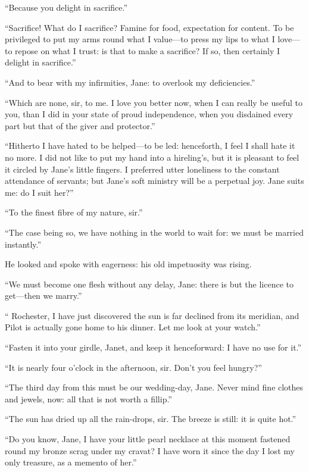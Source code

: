 \enquote{Because you delight in sacrifice.}

\enquote{Sacrifice! What do I sacrifice? Famine for food, expectation
for content. To be privileged to put my arms round what I value---to
press my lips to what I love---to repose on what I trust: is that to
make a sacrifice? If so, then certainly I delight in sacrifice.}

\enquote{And to bear with my infirmities, Jane: to overlook my
deficiencies.}

\enquote{Which are none, sir, to me. I love you better now, when I can
really be useful to you, than I did in your state of proud independence,
when you disdained every part but that of the giver and protector.}

\enquote{Hitherto I have hated to be helped---to be led: henceforth, I
feel I shall hate it no more. I did not like to put my hand into a
hireling's, but it is pleasant to feel it circled by Jane's little
fingers. I preferred utter loneliness to the constant attendance of
servants; but Jane's soft ministry will be a perpetual joy. Jane suits
me: do I suit her?}

\enquote{To the finest fibre of my nature, sir.}

\enquote{The case being so, we have nothing in the world to wait for: we
must be married instantly.}

He looked and spoke with eagerness: his old impetuosity was rising.

\enquote{We must become one flesh without any delay, Jane: there is but
the licence to get---then we marry.}

\enquote{\Mr{} Rochester, I have just discovered the sun is far declined
from its meridian, and Pilot is actually gone home to his dinner. Let
me look at your watch.}

\enquote{Fasten it into your girdle, Janet, and keep it henceforward: I
have no use for it.}

\enquote{It is nearly four o'clock in the afternoon, sir. Don't you
feel hungry?}

\enquote{The third day from this must be our wedding-day, Jane. Never
mind fine clothes and jewels, now: all that is not worth a fillip.}

\enquote{The sun has dried up all the rain-drops, sir. The breeze is
still: it is quite hot.}

\enquote{Do you know, Jane, I have your little pearl necklace at this
moment fastened round my bronze scrag under my cravat? I have worn it
since the day I lost my only treasure, as a memento of her.}

